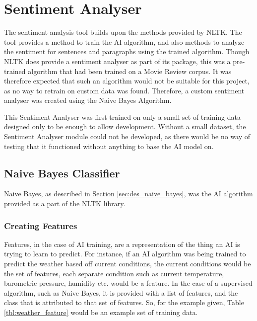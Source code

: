 \section{Sentiment Analyser}
\label{sec:imp_sentiment_analyzer}

The sentiment analysis tool builds upon the methods provided by NLTK. The tool provides a method to train the AI algorithm, and also methods to analyze the sentiment for sentences and paragraphs using the trained algorithm. Though NLTK does provide a sentiment analyser as part of its package, this was a pre-trained algorithm that had been trained on a Movie Review corpus. It was therefore expected that such an algorithm would not be suitable for this project, as no way to retrain on custom data was found. Therefore, a custom sentiment analyser was created using the Naive Bayes Algorithm.

This Sentiment Analyser was first trained on only a small set of training data designed only to be enough to allow development. Without a small dataset, the Sentiment Analyser module could not be developed, as there would be no way of testing that it functioned without anything to base the AI model on.
\subsection{Naive Bayes Classifier}
\label{sec:imp_naive_bayes}

Naive Bayes, as described in Section \ref{sec:des_naive_bayes}, was the AI algorithm provided as a part of the NLTK library.

\subsubsection{Creating Features}
\label{sec:imp_create_features}

Features, in the case of AI training, are a representation of the thing an AI is trying to learn to predict\cite{Mitchell1997}. For instance, if an AI algorithm was being trained to predict the weather based off current conditions, the current conditions would be the set of features, each separate condition such as  current temperature, barometric pressure, humidity etc. would be a feature. In the case of a supervised algorithm, such as Naive Bayes, it is provided with a list of features, and the class that is attributed to that set of features. So, for the example given, Table \ref{tbl:weather_feature} would be an example set of training data.

